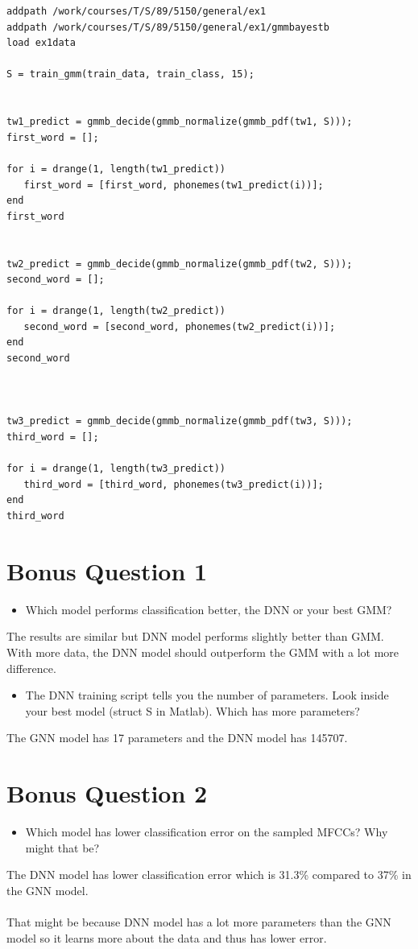 \documentclass[17pt]{article}
\begin{document}
\begin{lstlisting}
addpath /work/courses/T/S/89/5150/general/ex1
addpath /work/courses/T/S/89/5150/general/ex1/gmmbayestb
load ex1data

S = train_gmm(train_data, train_class, 15);


tw1_predict = gmmb_decide(gmmb_normalize(gmmb_pdf(tw1, S)));
first_word = [];

for i = drange(1, length(tw1_predict))
   first_word = [first_word, phonemes(tw1_predict(i))];
end
first_word


tw2_predict = gmmb_decide(gmmb_normalize(gmmb_pdf(tw2, S)));
second_word = [];

for i = drange(1, length(tw2_predict))
   second_word = [second_word, phonemes(tw2_predict(i))];
end
second_word



tw3_predict = gmmb_decide(gmmb_normalize(gmmb_pdf(tw3, S)));
third_word = [];

for i = drange(1, length(tw3_predict))
   third_word = [third_word, phonemes(tw3_predict(i))];
end
third_word

\end{lstlisting}


\section{Bonus Question 1}
\begin{itemize}
	\item{Which model performs classification better, the DNN or your best GMM?}
\end{itemize}
The results are similar but DNN model performs slightly better than GMM.
With more data, the DNN model should outperform the GMM with a lot more difference.

\begin{itemize}
	\item{The DNN training script tells you the number of parameters. Look inside your best model (struct S in Matlab). Which has more parameters? }
\end{itemize}
The GNN model has 17 parameters and the DNN model has 145707.


\section{Bonus Question 2}
\begin{itemize}
	\item{Which model has lower classification error on the sampled MFCCs? Why might that be?}
\end{itemize}
The DNN model has lower classification error which is 31.3\% compared to 37\% in the GNN model. \\~\\
That might be because DNN model has a lot more parameters than the GNN model so it learns more about the data and thus has lower error.
  
\end{document}
